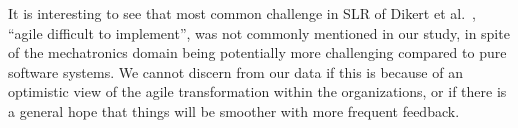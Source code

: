 \documentclass[10pt,a4paper]{IEEEtran} %
\begin{document}
\begin{comment}

The second main challenge from K\"{o}nn\"{o}l\"{a} et al.~``the specialization of the
team members in the hardware or software tasks'', confirms our identified practices
concerning the importance of coordinated multidisciplinary work in agile development.

Dikert et al.~\cite{dikert_challenges_2016} found 35 challenges for
large-scale agile transformations based on a systematic literature review (SLR). Their keywords
explicitly focus on software by excluding papers containing \emph{manufacturing}
in title or abstract. 
Regardless, a direct comparison between their challenges and the challenges found in
Fig.~\ref{fig:challenges} concludes that challenges in agile transformations in different
domains have more in common than what is different. A direct comparison of each challenge
is seen in Tab.~\ref{tab:dikert}, 
\end{comment}



It is interesting to see that most common challenge in SLR of Dikert et
al.~\cite{dikert_challenges_2016}, ``agile difficult to implement'', was not commonly
mentioned in our study, in spite of the mechatronics domain being potentially more
challenging compared to pure software systems. We cannot discern from our data if
this is because of an optimistic view of the agile transformation within the
organizations, or if there is a general hope that things will be smoother with
more frequent feedback.
\end{document}
